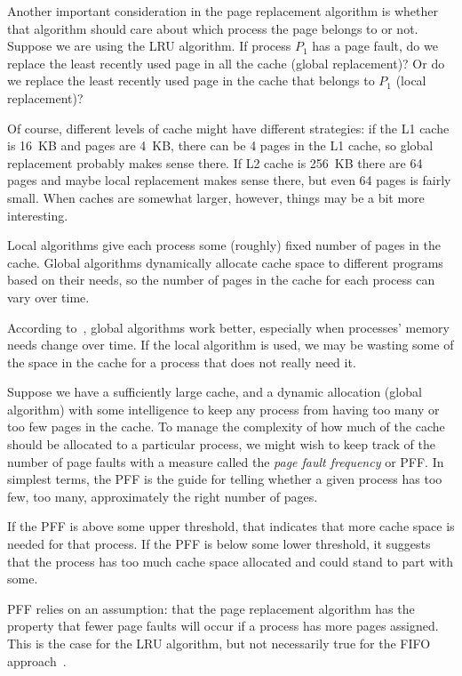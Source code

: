 Another important consideration in the page replacement algorithm is whether that algorithm should care about which process the page belongs to or not. Suppose we are using the LRU algorithm. If process $P_{1}$ has a page fault, do we replace the least recently used page in all the cache (global replacement)? Or do we replace the least recently used page in the cache that belongs to $P_{1}$ (local replacement)?

Of course, different levels of cache might have different strategies: if the L1 cache is 16~KB and pages are 4~KB, there can be 4 pages in the L1 cache, so global replacement probably makes sense there. If L2 cache is 256~KB there are 64 pages and maybe local replacement makes sense there, but even 64 pages is fairly small. When caches are somewhat larger, however, things may be a bit more interesting.

Local algorithms give each process some (roughly) fixed number of pages in the cache. Global algorithms dynamically allocate cache space to different programs based on their needs, so the number of pages in the cache for each process can vary over time. 

According to~\cite{mos}, global algorithms work better, especially when processes' memory needs change over time. If the local algorithm is used, we may be wasting some of the space in the cache for a process that does not really need it. 

Suppose we have a sufficiently large cache, and a dynamic allocation (global algorithm) with some intelligence to keep any process from having too many or too few pages in the cache. To manage the complexity of how much of the cache should be allocated to a particular process, we might wish to keep track of the number of page faults with a measure called the \textit{page fault frequency} or PFF. In simplest terms, the PFF is the guide for telling whether a given process has too few, too many, approximately the right number of pages. 

If the PFF is above some upper threshold, that indicates that more cache space is needed for that process. If the PFF is below some lower threshold, it suggests that the process has too much cache space allocated and could stand to part with some.

PFF relies on an assumption: that the page replacement algorithm has the property that fewer page faults will occur if a process has more pages assigned. This is the case for the LRU algorithm, but not necessarily true for the FIFO approach~\cite{mte241}.




